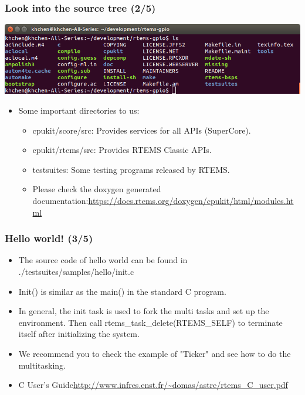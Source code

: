 \documentclass[t]{beamer}
\begin{document}
\begin{frame}
\frametitle{Look into the source tree (2/5)}
    \begin{center}
      \includegraphics[width=\textwidth]{figures/sourcetree}
    \end{center}
\begin{itemize}
\item Some important directories to us:
\begin{itemize}
\item cpukit/score/src: Provides services for all APIs (SuperCore).
\item cpukit/rtems/src: Provides RTEMS Classic APIs.
\item testsuites: Some testing programs released by RTEMS.
\item Please check the doxygen generated documentation:\newline \url{https://docs.rtems.org/doxygen/cpukit/html/modules.html}
\end{itemize}
\end{itemize}
\end{frame}

\begin{frame}
\frametitle{Hello world! (3/5)}
\begin{itemize}
\item The source code of hello world can be found in ./testsuites/samples/hello/init.c
\item Init() is similar as the main() in the standard C program.
\item In general, the init task is used to fork the multi tasks and set up the environment. Then call rtems\_task\_delete(RTEMS\_SELF) to terminate itself after initializing the system.
\item We recommend you to check the example of "Ticker" and see how to do the multitasking.
\item C User's Guide\newline \url{http://www.infres.enst.fr/~domas/astre/rtems_C_user.pdf}

\end{itemize}
\end{frame}
\end{document}
